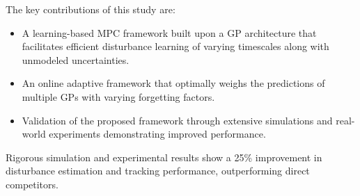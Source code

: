 The key contributions of this study are:

\begin{itemize}
\item A learning-based MPC framework built upon a GP architecture that facilitates efficient disturbance learning of varying timescales along with unmodeled uncertainties.
\item An online adaptive framework that optimally weighs the predictions of multiple GPs with varying forgetting factors.
\item Validation of the proposed framework through extensive simulations and real-world experiments demonstrating improved performance.
\end{itemize}

Rigorous simulation and experimental results show a 25\% improvement in disturbance estimation and tracking performance, outperforming direct competitors.